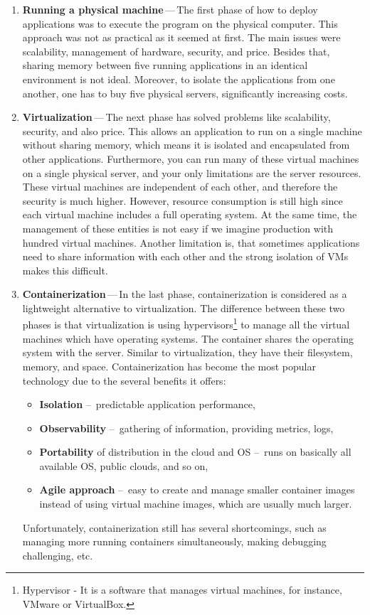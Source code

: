 \begin{enumerate}
    \item \textbf{Running a physical machine}\,---\,The first phase of how to deploy applications was to execute the program on the physical computer.
    This approach was not as practical as it seemed at first.
    The main issues were scalability, management of hardware, security, and price.
    Besides that, sharing memory between five running applications in an identical environment is not ideal.
    Moreover, to isolate the applications from one another, one has to buy five physical servers, significantly increasing costs.

    \item \textbf{Virtualization}\,---\,The next phase has solved problems like scalability, security, and also price.
    This allows an application to run on a single machine without sharing memory, which means it is isolated and encapsulated from other applications.
    Furthermore, you can run many of these virtual machines on a single physical server, and your only limitations are the server resources.
    These virtual machines are independent of each other, and therefore the security is much higher.
    However, resource consumption is still high since each virtual machine includes a full operating system.
    At the same time, the management of these entities is not easy if we imagine production with hundred virtual machines.
    Another limitation is, that sometimes applications need to share information with each other and the strong isolation of VMs makes this difficult.

    \item \textbf{Containerization}\,---\,In the last phase, containerization is considered as a lightweight alternative to virtualization.
    The difference between these two phases is that virtualization is using hypervisors\footnote{Hypervisor - It is a software that manages virtual machines, for instance, VMware or VirtualBox.} to manage all the virtual machines which have operating systems. The container shares the operating system with the server. Similar to virtualization, they have their filesystem, memory, and space. Containerization has become the most popular technology due to the several benefits it offers:
    \begin{itemize}[itemsep=1mm, parsep=0pt]
        \item \textbf{Isolation} \---\ predictable application performance,
        \item \textbf{Observability} \---\ gathering of information, providing metrics, logs,
        \item \textbf{Portability} of distribution in the cloud and OS \---\ runs on basically all available OS, public clouds, and so on,
        \item \textbf{Agile approach} \---\ easy to create and manage smaller container images instead of using virtual machine images, which are usually much larger.
    \end{itemize}
    Unfortunately, containerization still has several shortcomings, such as managing more running containers simultaneously, making debugging challenging, etc.


\end{enumerate}
